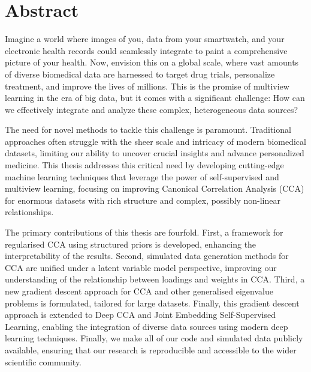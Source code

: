 \chapter*{Abstract}

Imagine a world where images of you, data from your smartwatch, and your electronic health records could seamlessly integrate to paint a comprehensive picture of your health. Now, envision this on a global scale, where vast amounts of diverse biomedical data are harnessed to target drug trials, personalize treatment, and improve the lives of millions. This is the promise of multiview learning in the era of big data, but it comes with a significant challenge: How can we effectively integrate and analyze these complex, heterogeneous data sources?

The need for novel methods to tackle this challenge is paramount. Traditional approaches often struggle with the sheer scale and intricacy of modern biomedical datasets, limiting our ability to uncover crucial insights and advance personalized medicine. This thesis addresses this critical need by developing cutting-edge machine learning techniques that leverage the power of self-supervised and multiview learning, focusing on improving Canonical Correlation Analysis (CCA) for enormous datasets with rich structure and complex, possibly non-linear relationships.

The primary contributions of this thesis are fourfold. First, a framework for regularised CCA using structured priors is developed, enhancing the interpretability of the results. Second, simulated data generation methods for CCA are unified under a latent variable model perspective, improving our understanding of the relationship between loadings and weights in CCA. Third, a new gradient descent approach for CCA and other generalised eigenvalue problems is formulated, tailored for large datasets. Finally, this gradient descent approach is extended to Deep CCA and Joint Embedding Self-Supervised Learning, enabling the integration of diverse data sources using modern deep learning techniques. Finally, we make all of our code and simulated data publicly available, ensuring that our research is reproducible and accessible to the wider scientific community.
